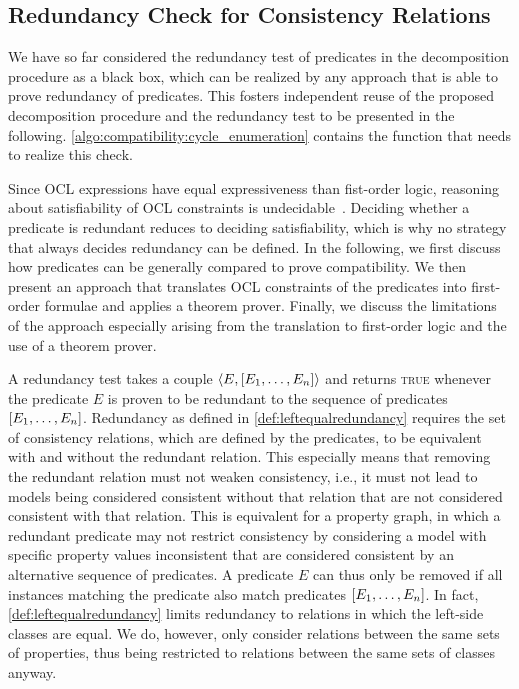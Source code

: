\subsection{Redundancy Check for Consistency Relations}
\label{chap:compatibility:practical_approach:redundancies}

We have so far considered the redundancy test of predicates in the decomposition procedure as a black box, which can be realized by any approach that is able to prove redundancy of predicates.
This fosters independent reuse of the proposed decomposition procedure and the redundancy test to be presented in the following.
\autoref{algo:compatibility:cycle_enumeration} contains the function  that needs to realize this check.

Since \gls{OCL} expressions have equal expressiveness than fist-order logic, reasoning about satisfiability of \gls{OCL} constraints is undecidable~\cite{beckert2002ocltranslation}.
Deciding whether a predicate is redundant reduces to deciding satisfiability, which is why no strategy that always decides redundancy can be defined.
In the following, we first discuss how predicates can be generally compared to prove compatibility.
We then present an approach that translates \gls{OCL} constraints of the predicates into first-order formulae and applies a theorem prover.
Finally, we discuss the limitations of the approach especially arising from the translation to first-order logic and the use of a theorem prover.

A redundancy test takes a couple $\langle E, [E_1, \dots, E_n] \rangle$ and returns \textsc{true} whenever the predicate $E$ is proven to be redundant to the sequence of predicates $[E_1, \dots, E_n]$.
Redundancy as defined in \autoref{def:leftequalredundancy} requires the set of consistency relations, which are defined by the predicates, to be equivalent with and without the redundant relation.
This especially means that removing the redundant relation must not weaken consistency, i.e., it must not lead to models being considered consistent without that relation that are not considered consistent with that relation.
This is equivalent for a property graph, in which a redundant predicate may not restrict consistency by considering a model with specific property values inconsistent that are considered consistent by an alternative sequence of predicates.
A predicate $E$ can thus only be removed if all instances matching the predicate also match predicates $[E_1, \dots, E_n]$.
In fact, \autoref{def:leftequalredundancy} limits redundancy to relations in which the left-side classes are equal.
We do, however, only consider relations between the same sets of properties, thus being restricted to relations between the same sets of classes anyway.

